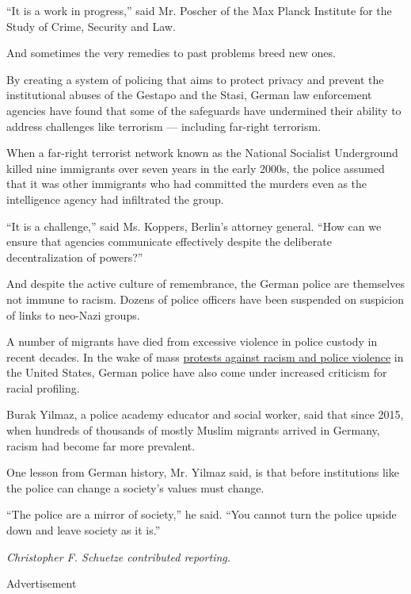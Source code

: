``It is a work in progress,'' said Mr. Poscher of the Max Planck
Institute for the Study of Crime, Security and Law.

And sometimes the very remedies to past problems breed new ones.

By creating a system of policing that aims to protect privacy and
prevent the institutional abuses of the Gestapo and the Stasi, German
law enforcement agencies have found that some of the safeguards have
undermined their ability to address challenges like terrorism ---
including far-right terrorism.

When a far-right terrorist network known as the National Socialist
Underground killed nine immigrants over seven years in the early 2000s,
the police assumed that it was other immigrants who had committed the
murders even as the intelligence agency had infiltrated the group.

``It is a challenge,'' said Ms. Koppers, Berlin's attorney general.
``How can we ensure that agencies communicate effectively despite the
deliberate decentralization of powers?''

And despite the active culture of remembrance, the German police are
themselves not immune to racism. Dozens of police officers have been
suspended on suspicion of links to neo-Nazi groups.

A number of migrants have died from excessive violence in police custody
in recent decades. In the wake of mass
\href{https://www.nytimes.com/news-event/george-floyd-protests-minneapolis-new-york-los-angeles?action=click\&pgtype=Article\&state=default\&module=styln-george-floyd\&variant=show\&region=TOP_BANNER\&context=storylines_menu}{protests
against racism and police violence} in the United States, German police
have also come under increased criticism for racial profiling.

Burak Yilmaz, a police academy educator and social worker, said that
since 2015, when hundreds of thousands of mostly Muslim migrants arrived
in Germany, racism had become far more prevalent.

One lesson from German history, Mr. Yilmaz said, is that before
institutions like the police can change a society's values must change.

``The police are a mirror of society,'' he said. ``You cannot turn the
police upside down and leave society as it is.''

\emph{Christopher F. Schuetze contributed reporting.}

Advertisement

